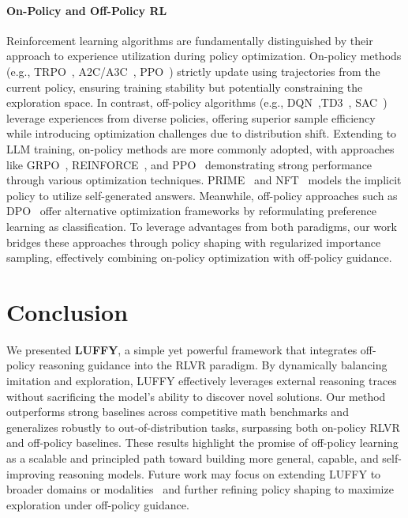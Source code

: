 \documentclass{article}
\begin{document}
\paragraph{On-Policy and Off-Policy RL}Reinforcement learning algorithms are fundamentally distinguished by their approach to experience utilization during policy optimization.
On-policy methods (e.g., TRPO~\cite{trpo}, A2C/A3C~\cite{mnih2016asynchronous}, PPO~\cite{ppo}) strictly update using trajectories from the current policy, ensuring training stability but potentially constraining the exploration space. In contrast, off-policy algorithms (e.g., DQN~\cite{mnih2013playing},TD3~\cite{fujimoto2018addressing}, SAC~\cite{haarnoja2018soft}) leverage experiences from diverse policies, offering superior sample efficiency while introducing optimization challenges due to distribution shift. Extending to LLM training, on-policy methods are more commonly adopted, with approaches like GRPO~\cite{grpo}, REINFORCE~\cite{sutton1999policy}, and PPO~\cite{ppo} demonstrating strong performance through various optimization techniques. 
PRIME~\cite{prime} and NFT~\cite{NFT} models the implicit policy to utilize self-generated answers.
Meanwhile, off-policy approaches such as DPO~\cite{rafailov2023direct} offer alternative optimization frameworks by reformulating preference learning as classification. To leverage advantages from both paradigms, our work bridges these approaches through policy shaping with regularized importance sampling, effectively combining on-policy optimization with off-policy guidance.


\section{Conclusion}
We presented \textbf{LUFFY}, a simple yet powerful framework that integrates off-policy reasoning guidance into the RLVR paradigm. 
By dynamically balancing imitation and exploration, LUFFY effectively leverages external reasoning traces without sacrificing the model’s ability to discover novel solutions. 
Our method outperforms strong baselines across competitive math benchmarks and generalizes robustly to out-of-distribution tasks, surpassing both on-policy RLVR and off-policy baselines. 
These results highlight the promise of off-policy learning as a scalable and principled path toward building more general, capable, and self-improving reasoning models.
Future work may focus on extending LUFFY to broader domains or modalities~\cite{hao2025can} and further refining policy shaping to maximize exploration under off-policy guidance. 

\clearpage




\clearpage
\appendix


\end{document}
